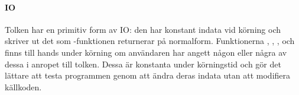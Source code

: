 \documentclass[../Core]{subfiles}
\begin{document}
\paragraph{IO}
Tolken har en primitiv form av IO: den har konstant indata vid körning och
skriver ut det som -funktionen returnerar på normalform. Funktionerna 
, 
,
,
 och 
finns till hands under körning om användaren har angett någon eller några av
dessa i anropet till tolken. Dessa är konstanta under körningstid och gör det
lättare att testa programmen genom att ändra deras indata utan att modifiera
källkoden.
\end{document}
